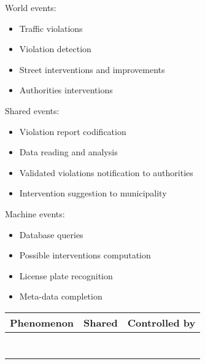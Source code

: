 World events:
\begin{itemize}
    \item Traffic violations
    \item Violation detection
    \item Street interventions and improvements
    \item Authorities interventions
\end{itemize}

Shared events:
\begin{itemize}
    \item Violation report codification
    \item Data reading and analysis
    \item Validated violations notification to authorities
    \item Intervention suggestion to municipality
\end{itemize}

Machine events:
\begin{itemize}
    \item Database queries
    \item Possible interventions computation
    \item License plate recognition
    \item Meta-data completion
\end{itemize}

\begin{tabular}{|p{8cm}|l|l|}
	\hline 
	Phenomenon & Shared & Controlled by \\ 
	\hline 
	&  &  \\ 
	\hline 
	&  &  \\ 
	\hline 
	&  &  \\ 
	\hline 
	&  &  \\ 
	\hline 
	&  &  \\ 
	\hline 
	&  &  \\ 
	\hline 
	&  &  \\ 
	\hline 
\end{tabular} 

